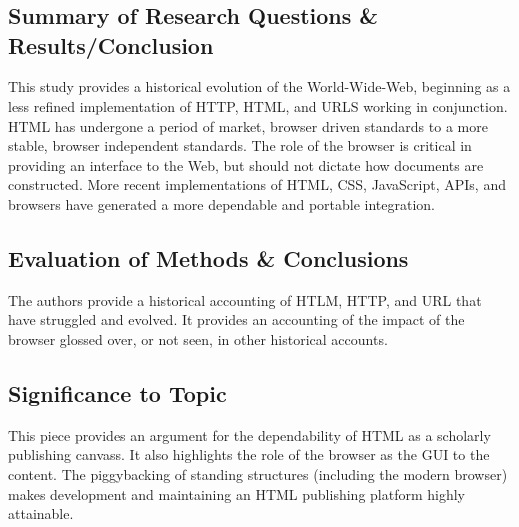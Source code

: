 \documentclass[leavefloats]{apa6e}\usepackage[]{graphicx}\usepackage[]{color}
\begin{document}

 \section{\textcite{Raman2009}}





\regpar



\subsection{Summary of Research Questions \& Results/Conclusion} %
This study provides a historical evolution of the World-Wide-Web, beginning as a less refined implementation of HTTP, HTML, and URLS working in conjunction.  HTML has undergone a period of market, browser driven standards to a more stable, browser independent standards.  The role of the browser is critical in providing an interface to the Web, but should not dictate how documents are constructed.  More recent implementations of HTML, CSS, JavaScript, APIs, and browsers have generated a more dependable and portable integration.

\subsection{Evaluation of Methods \& Conclusions} %
The authors provide a historical accounting of HTLM, HTTP, and URL that have struggled and evolved.  It provides an accounting of the impact of the browser glossed over, or not seen, in other historical accounts.

\subsection{Significance to Topic} %
This piece provides an argument for the dependability of HTML as a scholarly publishing canvass.  It also highlights the role of the browser as the GUI to the content.  The piggybacking of standing structures (including the modern browser) makes development and maintaining an HTML publishing platform highly attainable.





\clearpage
\printbibliography
\end{document}
